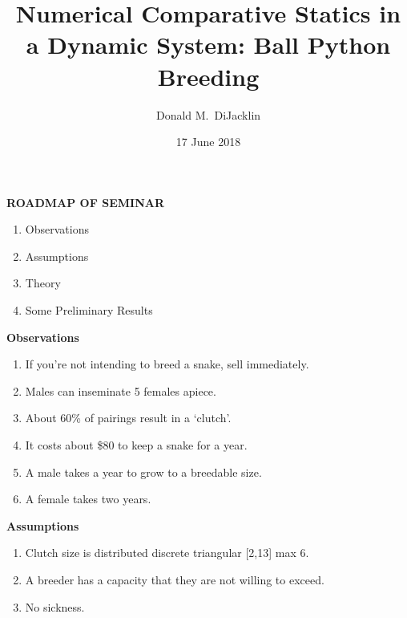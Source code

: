 \documentclass[grey,handout]{beamer}
\renewcommand{\frametitle}[1]{\begin{center}\textbf{#1}\end{center}}
\begin{document}
\title{Numerical Comparative Statics in a Dynamic System: Ball Python Breeding}

\author{Donald M.~DiJacklin}
\date{17 June 2018}

\begin{frame}
  \titlepage
\end{frame}

\begin{frame}
\frametitle{ROADMAP OF SEMINAR}
  \begin{enumerate}[<+->]
    \item Observations
    \item Assumptions
    \item Theory
    \item Some Preliminary Results
  \end{enumerate}
\end{frame}


\begin{frame}
\frametitle{Observations}
  \begin{enumerate}[<+->]
    \item If you're not intending to breed a snake, sell immediately.
    \item Males can inseminate 5 females apiece.
    \item About 60\% of pairings result in a `clutch'.
    \item It costs about \$80 to keep a snake for a year.
    \item A male takes a year to grow to a breedable size.
    \item A female takes two years.
  \end{enumerate}
  

\end{frame}
\begin{frame}
  \frametitle{Assumptions}
  \begin{enumerate}
    \item Clutch size is distributed discrete triangular [2,13] max 6.
    \item A breeder has a capacity that they are not willing to exceed.
    \item No sickness.
  \end{enumerate}
\end{frame}
\end{document}
